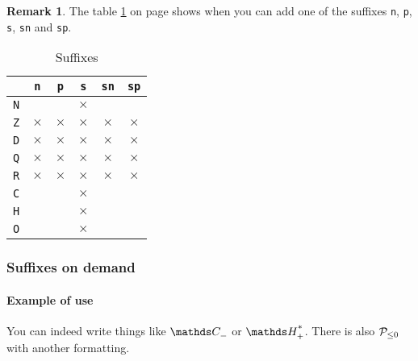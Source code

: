 \documentclass[12pt,a4paper]{article}
\theoremstyle{definition}
\newtheorem*{remark}{Remark}
\begin{document}
\medskip

\begin{remark}
	The table \ref{table:suffixes-sets} on page \pageref{table:suffixes-sets} shows when you can add one of the suffixes \verb+n+, \verb+p+, \verb+s+, \verb+sn+ and \verb+sp+.
\end{remark}

\newcommand\xx{\phantom{$\times$}}
\begin{table}[h]
    \caption{Suffixes}
    \begin{center}
        \begin{tabular}{c|c|c|c|c|c}
  & \verb+n+ & \verb+p+ & \verb+s+ & \verb+sn+ & \verb+sp+ \\
\hline \verb+N+ & \xx & \xx & $\times$ & \xx & \xx \\
\hline \verb+Z+ & $\times$ & $\times$ & $\times$ & $\times$ & $\times$ \\
\hline \verb+D+ & $\times$ & $\times$ & $\times$ & $\times$ & $\times$ \\
\hline \verb+Q+ & $\times$ & $\times$ & $\times$ & $\times$ & $\times$ \\
\hline \verb+R+ & $\times$ & $\times$ & $\times$ & $\times$ & $\times$ \\
\hline \verb+C+ & \xx & \xx & $\times$ & \xx & \xx \\
\hline \verb+H+ & \xx & \xx & $\times$ & \xx & \xx \\
\hline \verb+O+ & \xx & \xx & $\times$ & \xx & \xx \\
        \end{tabular}
    \end{center}
    \label{table:suffixes-sets}
\end{table}



        \subsubsection{Suffixes on demand}

            \paragraph{Example of use}

\begin{tcblisting}{}
You can indeed write things like $\specialset{\CC}{n}$ or $\specialset{\HH}{sp}$.
There is also $\specialset*{\probaset{P}}{n}$ with another formatting.
\end{tcblisting}
\end{document}
